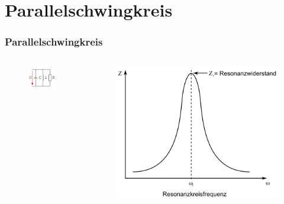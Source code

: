 \section*{Parallel\-schwing\-kreis}
\begin{frame}
  \frametitle{Parallelschwingkreis}
  \begin{center}
    \begin{columns}
      \begin{figure}
        \includegraphics[width=\textwidth,height=.4\textheight,keepaspectratio]{e07/Parallelschw.png}
      \end{figure}
      \begin{figure}
        \includegraphics[width=\textwidth,height=.35\textheight,keepaspectratio]{e07/ParallelschwSig.png}

\end{figure}
\end{columns}
\end{center}
\end{frame}
